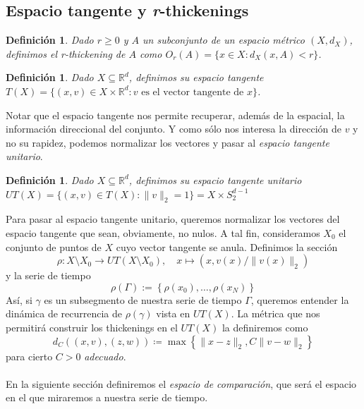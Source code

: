 \documentclass[12pt,a4paper]{article}
\newtheorem{definition}[theorem]{Definición}
\begin{document}
\subsection{Espacio tangente y \textit{r}-thickenings}
\begin{definition}
    Dado $r \geq 0$ y $A$ un subconjunto de un espacio métrico $(X,d_X)$, definimos el r-thickening de $A$ como $O_r(A) = \{ x \in X : d_X(x,A) < r \}$.
\end{definition}
\begin{definition}
    Dado $X \subseteq \mathbb{R}^d$, definimos su espacio tangente $T(X) = \{(x,v) \in X \times \mathbb{R}^d : v \text{ es el vector tangente de } x\}$.
\end{definition}
Notar que el espacio tangente nos permite recuperar, además de la espacial, la información direccional del conjunto. Y como sólo nos interesa la dirección de $v$ y no su rapidez, podemos normalizar los vectores y pasar al \textit{espacio tangente unitario}.
\begin{definition}
    Dado $X \subseteq \mathbb{R}^d$, definimos su espacio tangente unitario $UT(X) = \{ (x,v) \in T(X) : \|v\|_2 = 1 \} = X \times S^{d-1}_2$
\end{definition}
Para pasar al espacio tangente unitario, queremos normalizar los vectores del espacio tangente que sean, obviamente, no nulos. A tal fin, consideramos $X_0$ el conjunto de puntos de $X$ cuyo vector tangente se anula. Definimos la sección
\[
    \rho : X \setminus X_0 \to UT(X \setminus X_0), \quad x \mapsto (x, v(x)/\|v(x)\|_2 )
\]
y la serie de tiempo
\[
    \rho(\Gamma) := \left\{ \rho(x_0), \dots, \rho(x_N) \right\}
\]
Así, si $\gamma$ es un subsegmento de nuestra serie de tiempo $\Gamma$, queremos entender la dinámica de recurrencia de $\rho(\gamma)$ vista en $UT(X)$. La métrica que nos permitirá construir los thickenings en el $UT(X)$ la definiremos como
\[
    d_C((x,v),(z,w)) \coloneqq \max\left\{ \|x-z\|_2, C \|v-w\|_2 \right\}
\]
para cierto $C > 0$ \textit{adecuado}.
\\
\\
En la siguiente sección definiremos el \textit{espacio de comparación}, que será el espacio en el que miraremos a nuestra serie de tiempo.
\end{document}
